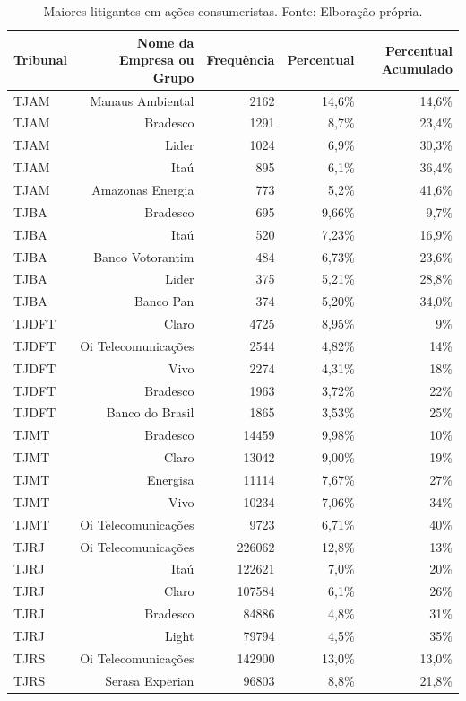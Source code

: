 \documentclass[]{report}
\begin{document}
\begin{longtable}{lrrrr}
\caption{Maiores litigantes em ações consumeristas. Fonte: Elboração própria.} \\
  \hline
Tribunal & Nome da Empresa ou Grupo & Frequência & Percentual & Percentual Acumulado \\
  \hline
TJAM & Manaus
Ambiental & 2162 & 14,6\% & 14,6\% \\
  TJAM & Bradesco & 1291 & 8,7\% & 23,4\% \\
  TJAM & Lider & 1024 & 6,9\% & 30,3\% \\
  TJAM & Itaú & 895 & 6,1\% & 36,4\% \\
  TJAM & Amazonas
Energia & 773 & 5,2\% & 41,6\% \\
  TJBA & Bradesco & 695 & 9,66\% & 9,7\% \\
  TJBA & Itaú & 520 & 7,23\% & 16,9\% \\
  TJBA & Banco
Votorantim & 484 & 6,73\% & 23,6\% \\
  TJBA & Lider & 375 & 5,21\% & 28,8\% \\
  TJBA & Banco Pan & 374 & 5,20\% & 34,0\% \\
  TJDFT & Claro & 4725 & 8,95\% & 9\% \\
  TJDFT & Oi
Telecomunicações & 2544 & 4,82\% & 14\% \\
  TJDFT & Vivo & 2274 & 4,31\% & 18\% \\
  TJDFT & Bradesco & 1963 & 3,72\% & 22\% \\
  TJDFT & Banco do Brasil & 1865 & 3,53\% & 25\% \\
  TJMT & Bradesco & 14459 & 9,98\% & 10\% \\
  TJMT & Claro & 13042 & 9,00\% & 19\% \\
  TJMT & Energisa & 11114 & 7,67\% & 27\% \\
  TJMT & Vivo & 10234 & 7,06\% & 34\% \\
  TJMT & Oi
Telecomunicações & 9723 & 6,71\% & 40\% \\
  TJRJ & Oi
Telecomunicações & 226062 & 12,8\% & 13\% \\
  TJRJ & Itaú & 122621 & 7,0\% & 20\% \\
  TJRJ & Claro & 107584 & 6,1\% & 26\% \\
  TJRJ & Bradesco & 84886 & 4,8\% & 31\% \\
  TJRJ & Light & 79794 & 4,5\% & 35\% \\
  TJRS & Oi
Telecomunicações & 142900 & 13,0\% & 13,0\% \\
  TJRS & Serasa Experian & 96803 & 8,8\% & 21,8\% \\

\end{longtable}
\end{document}
